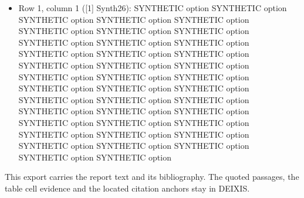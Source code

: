 \documentclass[journal]{IEEEtran}
\begin{document}
\begin{itemize}
\item[1.] Row 1, column 1 ([1] Synth26): SYNTHETIC option SYNTHETIC option SYNTHETIC option SYNTHETIC option SYNTHETIC option SYNTHETIC option SYNTHETIC option SYNTHETIC option SYNTHETIC option SYNTHETIC option SYNTHETIC option SYNTHETIC option SYNTHETIC option SYNTHETIC option SYNTHETIC option SYNTHETIC option SYNTHETIC option SYNTHETIC option SYNTHETIC option SYNTHETIC option SYNTHETIC option SYNTHETIC option SYNTHETIC option SYNTHETIC option SYNTHETIC option SYNTHETIC option SYNTHETIC option SYNTHETIC option SYNTHETIC option SYNTHETIC option SYNTHETIC option SYNTHETIC option SYNTHETIC option SYNTHETIC option SYNTHETIC option SYNTHETIC option SYNTHETIC option SYNTHETIC option SYNTHETIC option SYNTHETIC option
\end{itemize}

This export carries the report text and its bibliography. The quoted passages, the table cell evidence and the located citation anchors stay in DEIXIS.




\end{document}
